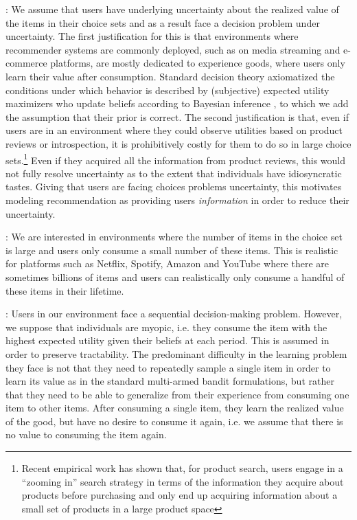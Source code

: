 \documentclass[format=acmsmall, review=false]{acmart}
\newcommand{\xhdr}[1]{\vspace{1mm} \noindent{\bf #1}}
\begin{document}
\xhdr{Uncertainty}: We assume that users have underlying uncertainty about the realized value of the items in their choice sets and as a result face a decision problem under uncertainty. The first justification for this is that environments where recommender systems are commonly deployed, such as on media streaming and e-commerce platforms, are mostly dedicated to experience goods, where users only learn their value after consumption. Standard decision theory axiomatized the conditions under which behavior is described by (subjective) expected utility maximizers \cite{savage1954} who update beliefs according to Bayesian inference \cite{ghirardato2002revisiting}, to which we add the assumption that their prior is correct. The second justification is that, even if users are in an environment where they could observe utilities based on product reviews or introspection, it is prohibitively costly for them to do so in large choice sets.\footnote{Recent empirical work \cite{bronnenberg2016zooming,hodgson2019horse} has shown that, for product search, users engage in a ``zooming in'' search strategy in terms of the information they acquire about products before purchasing and only end up acquiring information about a small set of products in a large product space}  Even if they acquired all the information from product reviews, this would not fully resolve uncertainty as to the extent that individuals have idiosyncratic tastes. Giving that users are facing choices problems uncertainty, this motivates modeling recommendation as providing users \textit{information} in order to reduce their uncertainty.
\par

\xhdr{Large Choice Sets}: We are interested in environments where the number of items in the choice set is large and users only consume a small number of these items. This is realistic for platforms such as Netflix, Spotify, Amazon and YouTube where there are sometimes billions of items and users can realistically only consume a handful of these items in their lifetime.\par

\xhdr{Learning Spillovers}: Users in our environment face a sequential decision-making problem. However, we suppose that individuals are myopic, i.e. they consume the item with the highest expected utility given their beliefs at each period. This is assumed in order to preserve tractability. The predominant difficulty in the learning problem they face is not that they need to repeatedly sample a single item in order to learn its value as in the standard multi-armed bandit formulations, but rather that they need to be able to generalize from their experience from consuming one item to other items. After consuming a single item, they learn the realized value of the good, but have no desire to consume it again, i.e. we assume that there is no value to consuming the item again.
\par
\end{document}
